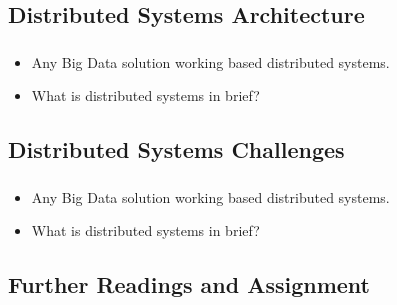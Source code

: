 

\subsection{Distributed Systems Architecture}
\begin{frame}
\frametitle{\subsecname}
\begin{itemize} 
	\item Any Big Data solution working based distributed systems.
	\item What is distributed systems in brief?
\end{itemize}
\end{frame}



\subsection{Distributed Systems Challenges}
\begin{frame}
\frametitle{\subsecname}
\begin{itemize} 
	\item Any Big Data solution working based distributed systems.
	\item What is distributed systems in brief?
\end{itemize}
\end{frame}





\subsection{Further Readings and Assignment}

